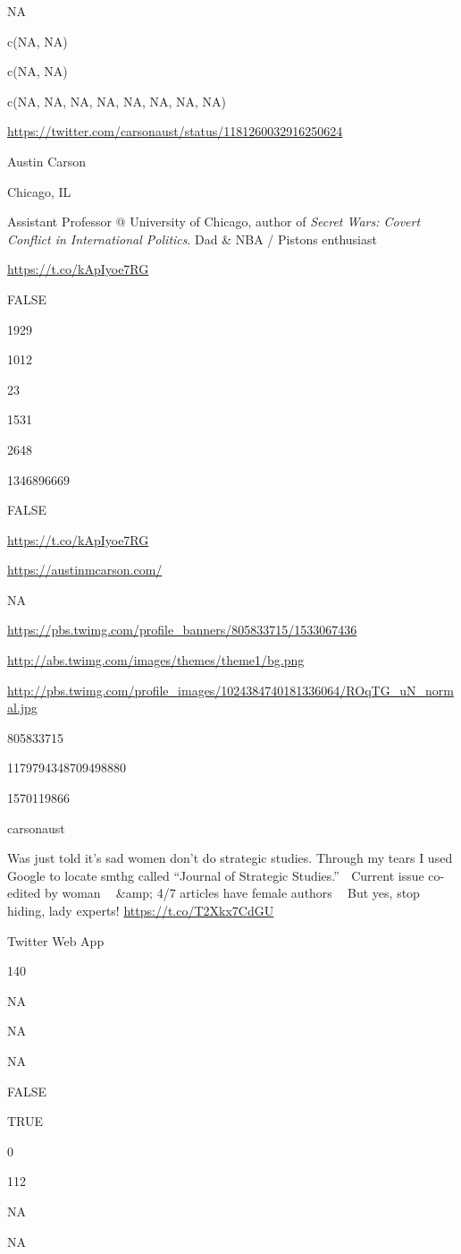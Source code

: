 \documentclass[]{book}
\begin{document}
NA

c(NA, NA)

c(NA, NA)

c(NA, NA, NA, NA, NA, NA, NA, NA)

\url{https://twitter.com/carsonaust/status/1181260032916250624}

Austin Carson

Chicago, IL

Assistant Professor @ University of Chicago, author of \emph{Secret
Wars: Covert Conflict in International Politics}. Dad \& NBA / Pistons
enthusiast

\url{https://t.co/kApIyoe7RG}

FALSE

1929

1012

23

1531

2648

1346896669

FALSE

\url{https://t.co/kApIyoe7RG}

\url{https://austinmcarson.com/}

NA

\url{https://pbs.twimg.com/profile_banners/805833715/1533067436}

\url{http://abs.twimg.com/images/themes/theme1/bg.png}

\url{http://pbs.twimg.com/profile_images/1024384740181336064/ROqTG_uN_normal.jpg}

805833715

1179794348709498880

1570119866

carsonaust

Was just told it's sad women don't do strategic studies. Through my
tears I used Google to locate smthg called ``Journal of Strategic
Studies.'' 🧐 Current issue co-edited by woman 🙋‍♀️ \&amp; 4/7 articles
have female authors 🙋‍♀️ But yes, stop hiding, lady experts!
\url{https://t.co/T2Xkx7CdGU}

Twitter Web App

140

NA

NA

NA

FALSE

TRUE

0

112

NA

NA
\end{document}
